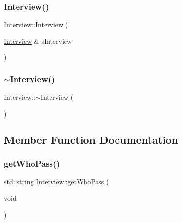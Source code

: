 \hypertarget{class_interview_a5910c3f8fd63842d118ffde49bce514b}{}\label{class_interview_a5910c3f8fd63842d118ffde49bce514b} 
\subsubsection{\texorpdfstring{Interview()}{Interview()}\hspace{0.1cm}{\footnotesize\ttfamily [3/3]}}
{\footnotesize\ttfamily Interview\+::\+Interview (\begin{DoxyParamCaption}\item[{\hyperlink{class_interview}{Interview} \&}]{s\+Interview }\end{DoxyParamCaption})\hspace{0.3cm}{\ttfamily [inline]}}

\hypertarget{class_interview_a5d38984d9695b62a2e4aabcf5295810c}{}\label{class_interview_a5d38984d9695b62a2e4aabcf5295810c} 
\subsubsection{\texorpdfstring{$\sim$\+Interview()}{~Interview()}}
{\footnotesize\ttfamily Interview\+::$\sim$\+Interview (\begin{DoxyParamCaption}{ }\end{DoxyParamCaption})\hspace{0.3cm}{\ttfamily [inline]}}



\subsection{Member Function Documentation}
\hypertarget{class_interview_adef4bd6cdccfc2a3e610ee2ef2489dcd}{}\label{class_interview_adef4bd6cdccfc2a3e610ee2ef2489dcd} 
\subsubsection{\texorpdfstring{get\+Who\+Pass()}{getWhoPass()}}
{\footnotesize\ttfamily std\+::string Interview\+::get\+Who\+Pass (\begin{DoxyParamCaption}\item[{void}]{ }\end{DoxyParamCaption})\hspace{0.3cm}{\ttfamily [inline]}}


